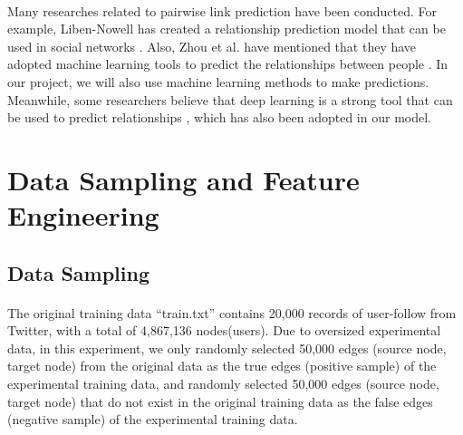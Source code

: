 \documentclass[fleqn,11pt]{olplainarticle}
\begin{document}
\paragraph*{}
Many researches related to pairwise link prediction have been conducted. For example, Liben-Nowell has created a relationship prediction model that can be used in social networks \citep{liben2007link}. Also, Zhou et al. have mentioned that they have adopted machine learning tools to predict the relationships between people \citep{lu2011link}. In our project, we will also use machine learning methods to make predictions. Meanwhile, some researchers believe that deep learning is a strong tool that can be used to predict relationships \citep{wang2019}, which has also been adopted in our model.



\section{Data Sampling and Feature Engineering}\label{datafeature}

\subsection{Data Sampling}\label{data}
\paragraph*{}
The original training data “train.txt” contains 20,000 records of user-follow from Twitter, with a total of 4,867,136 nodes(users). Due to oversized experimental data, in this experiment, we only randomly selected 50,000 edges (source node, target node) from the original data as the true edges (positive sample) of the experimental training data, and randomly selected 50,000 edges (source node, target node)  that do not exist in the original training data as the false edges (negative sample) of the experimental training data. 
\end{document}
